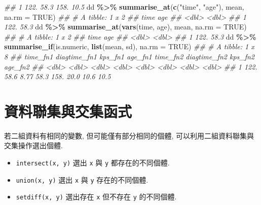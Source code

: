 \documentclass[
]{book}
\newenvironment{Shaded}{\begin{snugshade}}{\end{snugshade}}
\newcommand{\CommentTok}[1]{\textcolor[rgb]{0.56,0.35,0.01}{\textit{#1}}}
\newcommand{\DataTypeTok}[1]{\textcolor[rgb]{0.13,0.29,0.53}{#1}}
\newcommand{\KeywordTok}[1]{\textcolor[rgb]{0.13,0.29,0.53}{\textbf{#1}}}
\newcommand{\NormalTok}[1]{#1}
\newcommand{\OperatorTok}[1]{\textcolor[rgb]{0.81,0.36,0.00}{\textbf{#1}}}
\newcommand{\OtherTok}[1]{\textcolor[rgb]{0.56,0.35,0.01}{#1}}
\newcommand{\StringTok}[1]{\textcolor[rgb]{0.31,0.60,0.02}{#1}}
\providecommand{\tightlist}{%
  \setlength{\itemsep}{0pt}\setlength{\parskip}{0pt}}
\begin{document}
\begin{Shaded}
\begin{Highlighting}[]
\CommentTok{\#\# 1     122.    58.3     158.    10.5}
\NormalTok{dd }\OperatorTok{\%\textgreater{}\%}\StringTok{ }
\StringTok{  }\KeywordTok{summarise\_at}\NormalTok{(}\KeywordTok{c}\NormalTok{(}\StringTok{"time"}\NormalTok{, }\StringTok{"age"}\NormalTok{), mean, }\DataTypeTok{na.rm =} \OtherTok{TRUE}\NormalTok{)}
\CommentTok{\#\# \# A tibble: 1 x 2}
\CommentTok{\#\#    time   age}
\CommentTok{\#\#   \textless{}dbl\textgreater{} \textless{}dbl\textgreater{}}
\CommentTok{\#\# 1  122.  58.3}
\NormalTok{dd }\OperatorTok{\%\textgreater{}\%}\StringTok{ }
\StringTok{  }\KeywordTok{summarise\_at}\NormalTok{(}\KeywordTok{vars}\NormalTok{(time, age), mean, }\DataTypeTok{na.rm =} \OtherTok{TRUE}\NormalTok{)}
\CommentTok{\#\# \# A tibble: 1 x 2}
\CommentTok{\#\#    time   age}
\CommentTok{\#\#   \textless{}dbl\textgreater{} \textless{}dbl\textgreater{}}
\CommentTok{\#\# 1  122.  58.3}
\NormalTok{dd }\OperatorTok{\%\textgreater{}\%}\StringTok{ }
\StringTok{  }\KeywordTok{summarise\_if}\NormalTok{(is.numeric, }\KeywordTok{list}\NormalTok{(mean, sd), }\DataTypeTok{na.rm =} \OtherTok{TRUE}\NormalTok{)}
\CommentTok{\#\# \# A tibble: 1 x 8}
\CommentTok{\#\#   time\_fn1 diagtime\_fn1 kps\_fn1 age\_fn1 time\_fn2 diagtime\_fn2 kps\_fn2 age\_fn2}
\CommentTok{\#\#      \textless{}dbl\textgreater{}        \textless{}dbl\textgreater{}   \textless{}dbl\textgreater{}   \textless{}dbl\textgreater{}    \textless{}dbl\textgreater{}        \textless{}dbl\textgreater{}   \textless{}dbl\textgreater{}   \textless{}dbl\textgreater{}}
\CommentTok{\#\# 1     122.         58.6    8.77    58.3     158.         20.0    10.6    10.5}
\end{Highlighting}
\end{Shaded}

\hypertarget{ux8cc7ux6599ux806fux96c6ux8207ux4ea4ux96c6ux51fdux5f0f}{%
\section{資料聯集與交集函式}\label{ux8cc7ux6599ux806fux96c6ux8207ux4ea4ux96c6ux51fdux5f0f}}

若二組資料有相同的變數, 但可能僅有部分相同的個體,
可以利用二組資料聯集與交集操作選出個體.

\begin{itemize}
\tightlist
\item
  \texttt{intersect(x,\ y)} 選出 \texttt{x} 與 \texttt{y} 都存在的不同個體.
\item
  \texttt{union(x,\ y)} 選出 \texttt{x} 與 \texttt{y} 存在的不同個體.
\item
  \texttt{setdiff(x,\ y)} 選出存在 \texttt{x} 但不存在 \texttt{y} 的不同個體.
\end{itemize}
\end{document}
